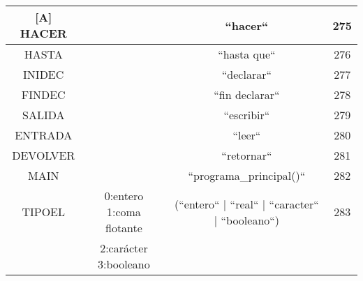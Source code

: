 \begin{table}
\begin{tabular}{| c | c | c | c |}[A]
HACER& & ``hacer`` & 275\\ \hline
HASTA& & ``hasta que`` & 276\\ \hline
INIDEC& & ``declarar`` & 277\\ \hline
FINDEC& & ``fin declarar`` & 278\\ \hline
SALIDA & & ``escribir`` & 279\\ \hline
ENTRADA & & ``leer`` & 280\\ \hline
DEVOLVER & & ``retornar`` & 281\\ \hline
MAIN & & ``programa\_principal()`` & 282\\ \hline
TIPOEL & 0:entero 1:coma flotante  & (``entero`` | ``real`` | ``caracter`` | ``booleano``) & 283\\
& 2:carácter 3:booleano& & \\ \hline

\end{tabular}
\end{table}

